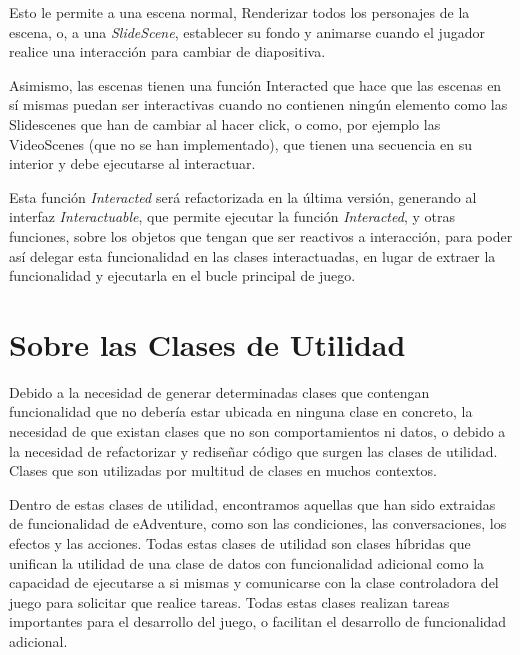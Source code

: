 Esto le permite a una escena normal, Renderizar todos los personajes de la escena, o, a una \textit{SlideScene}, establecer su fondo y animarse cuando el jugador realice una interacción para cambiar de diapositiva.

Asimismo, las escenas tienen una función Interacted que hace que las escenas en sí mismas puedan ser interactivas cuando no contienen ningún elemento como las Slidescenes que han de cambiar al hacer click, o como, por ejemplo las VideoScenes (que no se han implementado), que tienen una secuencia en su interior y debe ejecutarse al interactuar.

Esta función \textit{Interacted} será refactorizada en la última versión, generando al interfaz \textit{Interactuable}, que permite ejecutar la función \textit{Interacted}, y otras funciones, sobre los objetos que tengan que ser reactivos a interacción, para poder así delegar esta funcionalidad en las clases interactuadas, en lugar de extraer la funcionalidad y ejecutarla en el bucle principal de juego.

\section{Sobre las Clases de Utilidad}

Debido a la necesidad de generar determinadas clases que contengan funcionalidad que no debería estar ubicada en ninguna clase en concreto, la necesidad de que existan clases que no son comportamientos ni datos, o debido a la necesidad de refactorizar y rediseñar código que surgen las clases de utilidad. Clases que son utilizadas por multitud de clases en muchos contextos.

Dentro de estas clases de utilidad, encontramos aquellas que han sido extraidas de funcionalidad de eAdventure, como son las condiciones, las conversaciones, los efectos y las acciones. Todas estas clases de utilidad son clases híbridas que unifican la utilidad de una clase de datos con funcionalidad adicional como la capacidad de ejecutarse a si mismas y comunicarse con la clase controladora del juego para solicitar que realice tareas. Todas estas clases realizan tareas importantes para el desarrollo del juego, o facilitan el desarrollo de funcionalidad adicional.

